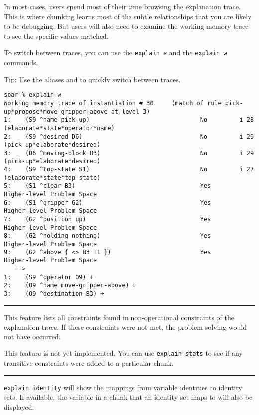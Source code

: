 In most cases, users spend most of their time browsing the explanation
trace. This is where chunking learns most of the subtle relationships
that you are likely to be debugging. But users will also need to examine
the working memory trace to see the specific values matched.

To switch between traces, you can use the \texttt{explain\ e} and the
\texttt{explain\ w} commands.

Tip: Use the aliases  and  to quickly switch between traces.

{\scriptsize
\begin{verbatim}
soar % explain w
Working memory trace of instantiation # 30     (match of rule pick-up*propose*move-gripper-above at level 3)
1:    (S9 ^name pick-up)                               No         i 28 (elaborate*state*operator*name)
2:    (S9 ^desired D6)                                 No         i 29 (pick-up*elaborate*desired)
3:    (D6 ^moving-block B3)                            No         i 29 (pick-up*elaborate*desired)
4:    (S9 ^top-state S1)                               No         i 27 (elaborate*state*top-state)
5:    (S1 ^clear B3)                                   Yes        Higher-level Problem Space
6:    (S1 ^gripper G2)                                 Yes        Higher-level Problem Space
7:    (G2 ^position up)                                Yes        Higher-level Problem Space
8:    (G2 ^holding nothing)                            Yes        Higher-level Problem Space
9:    (G2 ^above { <> B3 T1 })                         Yes        Higher-level Problem Space
   -->
1:    (S9 ^operator O9) +
2:    (O9 ^name move-gripper-above) +
3:    (O9 ^destination B3) +
\end{verbatim}
}

\rule{\textwidth}{1pt}

\textbf{}

This feature lists all constraints found in non-operational constraints of the explanation trace.
If these constraints were not met, the problem-solving would not have occurred.

This feature is not yet implemented. You can use \texttt{explain\ stats}
to see if any transitive constraints were added to a particular chunk.

\rule{\textwidth}{1pt}

\textbf{}

\texttt{explain\ identity} will show the mappings from variable
identities to identity sets. If available, the variable in a chunk that
an identity set maps to will also be displayed.


